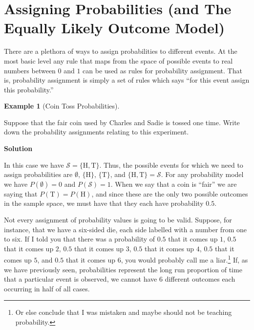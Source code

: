 \documentclass[
  letterpaper,
  DIV=11,
  numbers=noendperiod]{scrreprt}
\theoremstyle{definition}
\theoremstyle{definition}
\newtheorem{example}{Example}[chapter]
\theoremstyle{definition}
\theoremstyle{remark}
\begin{document}
\section{Assigning Probabilities (and The Equally Likely Outcome
Model)}\label{assigning-probabilities-and-the-equally-likely-outcome-model}

There are a plethora of ways to assign probabilities to different
events. At the most basic level any rule that maps from the space of
possible events to real numbers between \(0\) and \(1\) can be used as
rules for probability assignment. That is, probability assignment is
simply a set of rules which says ``for this event assign this
probability.''

\begin{example}[Coin Toss
Probabilities]\protect\hypertarget{exm-coin-toss}{}\label{exm-coin-toss}

Suppose that the fair coin used by Charles and Sadie is tossed one time.
Write down the probability assignments relating to this experiment.

\begin{tcolorbox}[enhanced jigsaw, colback=white, colframe=quarto-callout-color-frame, arc=.35mm, leftrule=.75mm, rightrule=.15mm, opacityback=0, breakable, bottomrule=.15mm, left=2mm, toprule=.15mm]

\vspace{-3mm}\textbf{Solution}\vspace{3mm}

In this case we have \(\mathcal{S} = \{\text{H},\text{T}\}\). Thus, the
possible events for which we need to assign probabilities are
\(\emptyset\), \(\{\text{H}\}\), \(\{\text{T}\}\), and
\(\{\text{H},\text{T}\} = \mathcal{S}\). For any probability model we
have \(P(\emptyset) = 0\) and \(P(\mathcal{S}) = 1\). When we say that a
coin is ``fair'' we are saying that \(P(\text{T}) = P(\text{H})\), and
since these are the only two possible outcomes in the sample space, we
must have that they each have probability \(0.5\).

\end{tcolorbox}

\end{example}

Not every assignment of probability values is going to be valid.
Suppose, for instance, that we have a six-sided die, each side labelled
with a number from one to six. If I told you that there was a
probability of \(0.5\) that it comes up \(1\), \(0.5\) that it comes up
\(2\), \(0.5\) that it comes up \(3\), \(0.5\) that it comes up \(4\),
\(0.5\) that it comes up \(5\), and \(0.5\) that it comes up \(6\), you
would probably call me a liar.\footnote{Or else conclude that I was
  mistaken and maybe should not be teaching probability.} If, as we have
previously seen, probabilities represent the long run proportion of time
that a particular event is observed, we cannot have \(6\) different
outcomes each occurring in half of all cases.
\end{document}
